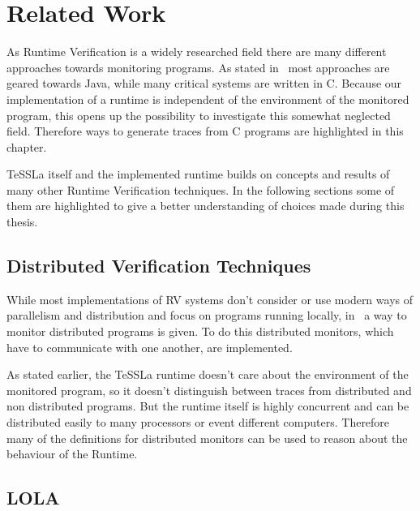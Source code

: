 %
\chapter{Related Work}
\label{sec:related}

As Runtime Verification is a widely researched field there are many different approaches towards monitoring programs.
As stated in~\cite{Havelund2008} most approaches are geared towards Java, while many critical systems are written in C.
Because our implementation of a runtime is independent of the environment of the monitored program, this opens up the possibility to investigate this somewhat neglected field.
Therefore ways to generate traces from C programs are highlighted in this chapter.

TeSSLa itself and the implemented runtime builds on concepts and results of many other Runtime Verification techniques.
In the following sections some of them are highlighted to give a better understanding of choices made during this thesis.

\section{Distributed Verification Techniques}
\label{sec:related:distributed}

While most implementations of RV systems don't consider or use modern ways of parallelism and distribution and focus on programs running locally, in~\cite{Mostafa2015} a way to monitor distributed programs is given.
To do this distributed monitors, which have to communicate with one another, are implemented.

As stated earlier, the TeSSLa runtime doesn't care about the environment of the monitored program, so it doesn't distinguish between traces from distributed and non distributed programs.
But the runtime itself is highly concurrent and can be distributed easily to many processors or event different computers.
Therefore many of the definitions for distributed monitors can be used to reason about the behaviour of the Runtime.

\section{LOLA}
\label{sec:related:lola}

